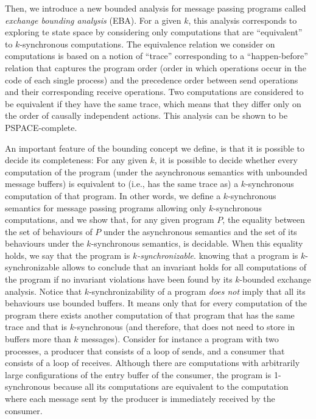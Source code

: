 Then, we introduce a new bounded analysis for message passing programs called {\em exchange bounding analysis} (EBA). For a given $k$, this analysis corresponds to exploring te state space by considering only computations that are “equivalent” to $k$-synchronous computations. The equivalence relation we consider on computations is based on a notion of “trace” corresponding to a “happen-before” relation that captures the program order (order in which operations occur in the code of each single process) and the precedence order between send operations and their corresponding receive operations. Two computations are considered to be equivalent if they have the same trace, which means that they differ only on the order of causally independent actions. This analysis can be shown to be PSPACE-complete. 
%

An important feature of the bounding concept we define, is that it is possible to decide its completeness: For any given $k$, it is possible to decide whether every computation of the program (under the asynchronous semantics with unbounded message buffers) is equivalent to (i.e., has the same trace as) a $k$-synchronous computation of that program. 
In other words, we define a $k$-synchronous semantics for message passing programs allowing only $k$-synchronous computations, and we show that, for any given program $P$, the equality between the set of behaviours of $P$ under the asynchronous semantics and the set of its behaviours under the $k$-synchronous semantics, is decidable. When this equality holds, we say that the program is {\em $k$-synchronizable}. knowing that a program is $k$-synchronizable allows to conclude that an invariant holds for all computations of the program if no invariant violations have been found by its $k$-bounded exchange analysis. Notice that $k$-synchronizability of a program {\em does not} imply that all its behaviours use bounded buffers. It means only that for every computation of the program there exists another computation of that program that has the same trace and that is $k$-synchronous (and therefore, that does not need to store in  buffers more than $k$ messages). Consider for instance a program with two processes, a producer that consists of a loop of sends, and a consumer that consists of a loop of receives. Although there are computations with arbitrarily large configurations of the entry buffer of the consumer, the program is 1-synchronous because all its computations are equivalent to the computation where each message sent by the producer is immediately received by the consumer. 

